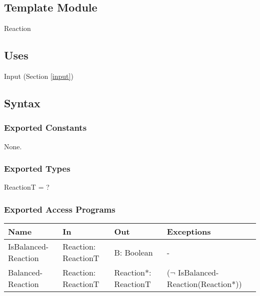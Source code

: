 \documentclass[12pt, titlepage]{article}
\begin{document}
\subsection{Template Module}

Reaction

\subsection{Uses}

 Input (Section \ref{input})

\subsection{Syntax}

\subsubsection{Exported Constants}

None.

\subsubsection{Exported Types}

ReactionT = ?

\subsubsection{Exported Access Programs}

\begin{center}
\begin{tabular}{p{2cm} p{4cm} p{4cm} p{2cm}}
\hline
\textbf{Name} & \textbf{In} & \textbf{Out} & \textbf{Exceptions} \\
\hline
{IsBalanced-Reaction} & Reaction: \newline ReactionT &  B: Boolean  & - \\
\hline
{Balanced-Reaction} & Reaction: \newline ReactionT &  Reaction*: \newline ReactionT  &  ($\neg$ IsBalanced-Reaction(Reaction*))\\
\hline
\end{tabular}
\end{center}

\end{document}
